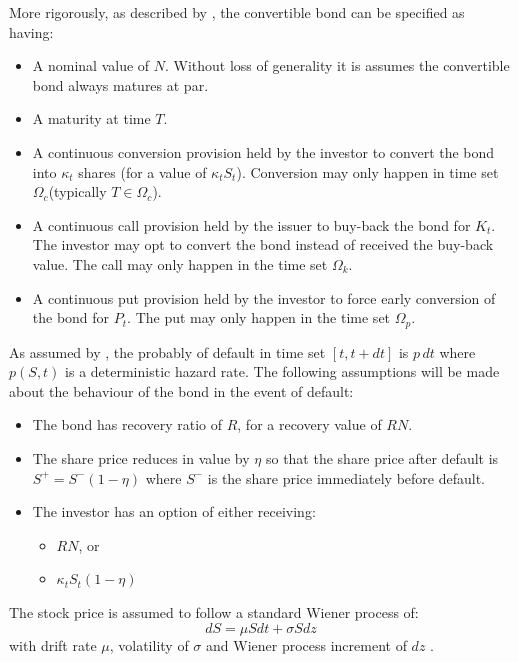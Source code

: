 \documentclass[a4paper,11pt,oneside]{article}
\def\convK{\ensuremath{\kappa_t}\xspace}
\def\convKS{\ensuremath{\convK S_t}\xspace}
\def\convT{\ensuremath{\Omega_c}\xspace}
\def\putK{\ensuremath{P_t}\xspace}
\def\putT{\ensuremath{\Omega_p}\xspace}
\def\callK{\ensuremath{K_t}\xspace}
\def\callT{\ensuremath{\Omega_k}\xspace}
\def\defN{\ensuremath{R}\xspace}
\def\defS{\ensuremath{\eta}\xspace}
\begin{document}
More rigorously, as described by \citet{AKW08}, the convertible bond can be specified as having:
\begin{itemize}[noitemsep,nolistsep]
 \item A nominal value of $N$.  Without loss of generality it is assumes the convertible bond always matures at par.
 \item A maturity at time $T$.
 \item A continuous conversion provision held by the investor to convert the bond into \convK shares (for a value of \convKS).  Conversion may only happen in time set \convT (typically $T \in \convT$).
 \item A continuous call provision held by the issuer to buy-back the bond for \callK.  The investor may opt to convert the bond instead of received the buy-back value.  The call may only happen in the time set \callT.
 \item A continuous put provision held by the investor to force early conversion of the bond for \putK.  The put may only happen in the time set \putT.
\end{itemize}

As assumed by \citet{AFV03}, the probably of default in time set $[t, t + dt]$ is $p\,dt$ where $p(S, t)$ is a deterministic hazard rate.  The following assumptions will be made about the behaviour of the bond in the event of default:
\begin{itemize}[noitemsep,nolistsep]
 \item The bond has recovery ratio of \defN, for a recovery value of $\defN N$.
 \item The share price reduces in value by \defS so that the share price after default is $S^+ = S^- (1 - \defS)$ where $S^-$ is the share price immediately before default.
 \item The investor has an option of either receiving:
 \begin{itemize}[noitemsep,nolistsep]
  \item $\defN N$, or
  \item $\convK S_t (1 - \defS)$
 \end{itemize}
\end{itemize}

The stock price is assumed to follow a standard Wiener process of:
\begin{displaymath}
dS = \mu S dt + \sigma S dz
\end{displaymath}
with drift rate $\mu$, volatility of $\sigma$ and Wiener process increment of $dz$ \cite{AFV03}.
\end{document}
